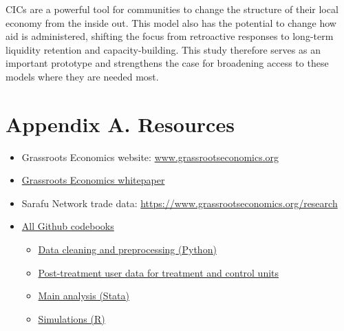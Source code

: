 \documentclass[12pt]{article}
\begin{document}
CICs are a powerful tool for communities to change the structure of their local economy from the inside out. This model also has the potential to change how aid is administered, shifting the focus from retroactive responses to long-term liquidity retention and capacity-building. This study therefore serves as an important prototype and strengthens the case for broadening access to these models where they are needed most.


\singlespacing
\setlength\bibsep{0pt}





\clearpage

\onehalfspacing


\section*{Appendix A. Resources} \label{sec:appendixa}

\begin{itemize}
    \item Grassroots Economics website: \url{www.grassrootseconomics.org}
    \item \href{https://docs.google.com/document/d/1Wmnpjc5bX1b8XP1kNtiZCqurMYw\_\_4sNmdHjtSnnLWQ/edit}{Grassroots Economics whitepaper}
    \item Sarafu Network trade data: \url{https://www.grassrootseconomics.org/research}
    \item \href{https://github.com/RebeccaMqamelo/Grassroots-Economics-Impact-Evaluation/tree/master/Randomized\%20Control\%20Trial}{All Github codebooks}
    \begin{itemize}
        \item \href{https://github.com/RebeccaMqamelo/Grassroots-Economics-Impact-Evaluation/blob/master/Randomized\%20Control\%20Trial/Format\%20Preprocessing\%20Codebook.ipynb}{Data cleaning and preprocessing (Python)}
        \item \href{https://github.com/RebeccaMqamelo/Grassroots-Economics-Impact-Evaluation/blob/master/Randomized\%20Control\%20Trial/new.csv}{Post-treatment user data for treatment and control units}
        \item \href{https://github.com/RebeccaMqamelo/Grassroots-Economics-Impact-Evaluation/blob/master/Randomized\%20Control\%20Trial/Main\%20Analysis.do}{Main analysis (Stata)}
        \item \href{https://github.com/RebeccaMqamelo/Grassroots-Economics-Impact-Evaluation/blob/master/Randomized\%20Control\%20Trial/Final\%20Simulations.R}{Simulations (R)}
    \end{itemize}
\end{itemize}
\end{document}
